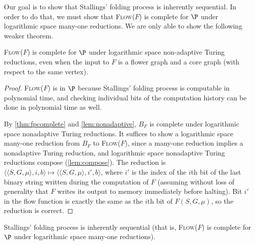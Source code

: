 \documentclass{article}
\newcommand{\Flow}{\textsc{Flow($F$)}}
\begin{document}
Our goal is to show that Stallings' folding process is inherently sequential.
In order to do that, we must show that \Flow{} is complete for $\P$ under logarithmic space many-one reductions.
We are only able to show the following weaker theorem.

\begin{theorem}
  \Flow{} is complete for $\P$ under logarithmic space non-adaptive Turing reductions, even when the input to $F$ is a flower graph and a core graph (with respect to the same vertex).
\end{theorem}
\begin{proof}
  \Flow{} is in $\P$ because Stallings' folding process is computable in polynomial time, and checking individual bits of the computation history can be done in polynomial time as well.

  By \autoref{thm:fpcomplete} and \autoref{lem:nonadaptive}, $B_F$ is complete under logarithmic space nonadaptive Turing reductions.
  It suffices to show a logarithmic space many-one reduction from $B_F$ to \Flow{}, since a many-one reduction implies a nonadaptive Turing reduction, and logarithmic space nonadaptive Turing reductions compose (\autoref{lem:compose}).
  The reduction is $\langle \langle S, G, \mu \rangle, i, b \rangle \mapsto \langle \langle S, G, \mu \rangle, i', b\rangle$, where $i'$ is the index of the $i$th bit of the last binary string written during the computation of $F$ (assuming without loss of generality that $F$ writes its output to memory immediately before halting).
  Bit $i'$ in the flow function is exactly the same as the $i$th bit of $F(S, G, \mu)$, so the reduction is correct.
\end{proof}

\begin{conjecture}
  Stallings' folding process is inherently sequential (that is, \Flow{} is complete for $\P$ under logarithmic space many-one reductions).
\end{conjecture}

\printbibliography
\end{document}
